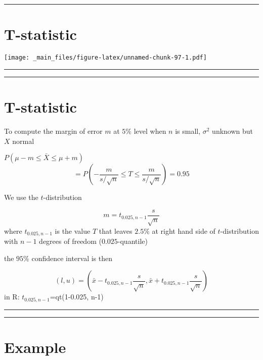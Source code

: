 \documentclass[
]{book}
\begin{document}
\begin{center}\rule{0.5\linewidth}{0.5pt}\end{center}

\hypertarget{t-statistic-4}{%
\section{T-statistic}\label{t-statistic-4}}

\texttt{[image: \_main\_files/figure-latex/unnamed-chunk-97-1.pdf]}

\begin{center}\rule{0.5\linewidth}{0.5pt}\end{center}

\begin{center}\rule{0.5\linewidth}{0.5pt}\end{center}

\hypertarget{t-statistic-5}{%
\section{T-statistic}\label{t-statistic-5}}

To compute the margin of error \(m\) at \(5\%\) level when \(n\) is small, \(\sigma^2\) unknown but \(X\) normal

\(P(\mu-m \leq \bar{X} \leq\mu + m)\)
\[=P(-\frac{m}{s/\sqrt{n}} \leq T \leq\frac{m}{s/\sqrt{n}})=0.95\]

We use the \(t\)-distribution

\[m=t_{0.025, n-1} \frac{s}{\sqrt{n}}\]
where \(t_{0.025, n-1}\) is the value \(T\) that leaves \(2.5\%\) at right hand side of \(t\)-distribution with \(n-1\) degrees of freedom (\(0.025\)-quantile)

the \(95\%\) confidence interval is then

\[(l,u)=(\bar{x}-t_{0.025, n-1} \frac{s}{\sqrt{n}}, \bar{x}+t_{0.025, n-1} \frac{s}{\sqrt{n}})\]
in R: \(t_{0.025, n-1}\)=qt(1-0.025, n-1)

\begin{center}\rule{0.5\linewidth}{0.5pt}\end{center}

\begin{center}\rule{0.5\linewidth}{0.5pt}\end{center}

\hypertarget{example-19}{%
\section{Example}\label{example-19}}
\end{document}
